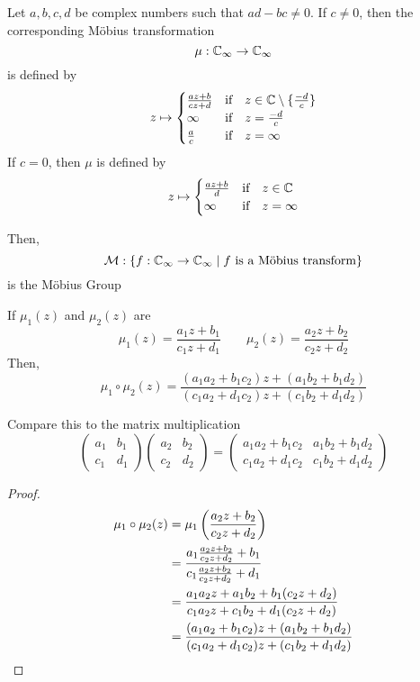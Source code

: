 \documentclass{article}
\begin{document}
\begin{defi}
    Let $a, b, c, d$ be complex numbers such that $ad - bc \neq 0$. If $c \neq 0$, then the corresponding M\"obius transformation
    \[
        \mu: \mathbb{C}_\infty \rightarrow \mathbb{C}_\infty
    \]
    is defined by
    \[
        z \mapsto \begin{cases}
            \frac{az + b}{cz + d} & \text{if} \quad z \in \mathbb{C} \setminus \{\frac{-d}{c}\} \\
            \infty & \text{if} \quad z = \frac{-d}{c} \\
            \frac{a}{c} & \text{if} \quad z = \infty
        \end{cases}  
    \]
    If $c = 0$, then $\mu$ is defined by
    \[
        z \mapsto \begin{cases}
            \frac{az+b}{d} & \text{if} \quad z \in \mathbb{C} \\
            \infty & \text{if} \quad z = \infty
        \end{cases}
    \]

    Then,
    \[
        \mathcal{M}: \{f: \mathbb{C}_\infty \rightarrow \mathbb{C}_\infty \mid f \ \text{is a M\"obius transform}\}
    \]
    is the M\"obius Group
\end{defi}

\begin{ex}
    If $\mu_1(z)$ and $\mu_2(z)$ are
    \[
        \mu_1(z) = \frac{a_1z + b_1}{c_1z+ d_1} \qquad \mu_2(z) = \frac{a_2z + b_2}{c_2z+ d_2}
    \]
    Then,
    \[
        \mu_1 \circ \mu_2 (z) = \frac{(a_1a_2 + b_1c_2)z + (a_1b_2 + b_1d_2)}{(c_1a_2 + d_1c_2)z + (c_1b_2 + d_1d_2)}
    \]

    Compare this to the matrix multiplication
    \[
        \begin{pmatrix}
            a_1 & b_1 \\
            c_1 & d_1
        \end{pmatrix}
        \begin{pmatrix}
            a_2 & b_2 \\
            c_2 & d_2
        \end{pmatrix}
        =
        \begin{pmatrix}
            a_1a_2 + b_1c_2 & a_1b_2 + b_1d_2 \\
            c_1a_2 + d_1c_2 & c_1b_2 + d_1d_2
        \end{pmatrix}
    \]
\end{ex}

\begin{proof}
    \begin{align*}
        \mu_1 \circ \mu_2 (z) &= \mu_1\left( \frac{a_2z + b_2}{c_2z+ d_2} \right) \\
        &= \frac{a_1 \frac{a_2z + b_2}{c_2z+ d_2}  + b_1}{c_1 \frac{a_2z + b_2}{c_2z+ d_2} + d_1} \\
        &= \frac{a_1a_2 z + a_1b_2 + b_1(c_2 z + d_2)}{c_1a_2 z + c_1b_2 + d_1(c_2 z + d_2)} \\
        &= \frac{(a_1a_2 + b_1c_2)z + (a_1b_2 + b_1d_2)}{(c_1a_2 + d_1c_2)z + (c_1b_2 + d_1d_2)}
    \end{align*}
\end{proof}
\end{document}
